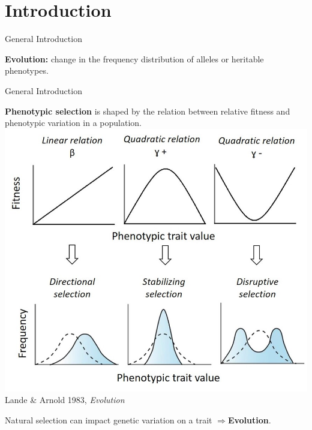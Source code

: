 \documentclass[compress]{beamer}
\begin{document}
\section{Introduction}
\begin{frame}{General Introduction}\vspace{10pt}

\raggedright
\textbf{Evolution:} change in the frequency distribution of alleles or heritable phenotypes. \\
 \vspace{0.3cm}
 \centering

  
\end{frame}
\begin{frame}{General Introduction}

\textbf{Phenotypic selection} is shaped by the relation between relative fitness and phenotypic variation in a population.\\
 \vspace{0.2cm}
 \centering
 \includegraphics[height = 5.5 cm]{Image/Phenotypic change.jpg} \\
 \raggedleft \tiny{Lande \& Arnold 1983, \textit{Evolution}} \\
  
\vspace{0.1cm}
\raggedright\normalsize
Natural selection can impact genetic variation on a trait \centering$\Longrightarrow$\textbf{Evolution}.

\end{frame}
\end{document}

